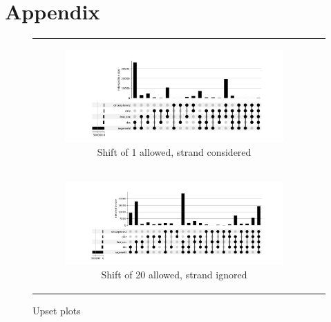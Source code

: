 \chapter{Appendix}

\begin{figure}[ht]
    \begin{tabular}{cc}
        \begin{subfigure}{\textwidth}
            \centering

            \includegraphics[width=\linewidth]{chapters/4_results_and_discussion/figures/detection/upset/diff_1_strand.png}
            \caption{Shift of 1 allowed, strand considered}
            \label{fig:detection_upset_1_strand}
        \end{subfigure}
        \\
        \begin{subfigure}{\textwidth}
            \centering

            \includegraphics[width=\linewidth]{chapters/4_results_and_discussion/figures/detection/upset/diff_20_nostrand.png}
            \caption{Shift of 20 allowed, strand ignored}
            \label{fig:detection_upset_20_nostrand}
        \end{subfigure}
    \end{tabular}
    \caption{Upset plots
    }
    \label{fig:appendix_detection_upset}
\end{figure}
